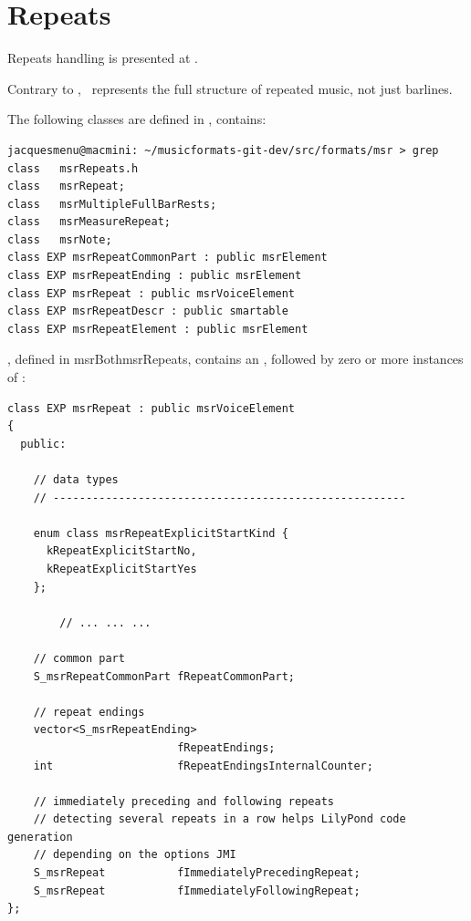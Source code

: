 \section{Repeats}\label{Repeats}

Repeats handling is presented at .

Contrary to \mxml, \mf\ represents the full structure of repeated music, not just barlines.

The following classes are defined in , contains:
\begin{lstlisting}[language=Terminal]
jacquesmenu@macmini: ~/musicformats-git-dev/src/formats/msr > grep class   msrRepeats.h
class   msrRepeat;
class   msrMultipleFullBarRests;
class   msrMeasureRepeat;
class   msrNote;
class EXP msrRepeatCommonPart : public msrElement
class EXP msrRepeatEnding : public msrElement
class EXP msrRepeat : public msrVoiceElement
class EXP msrRepeatDescr : public smartable
class EXP msrRepeatElement : public msrElement
\end{lstlisting}

, defined in msrBoth{msrRepeats}, contains an , followed by zero or more instances of :
\begin{lstlisting}[language=CPlusPlus]
class EXP msrRepeat : public msrVoiceElement
{
  public:

    // data types
    // ------------------------------------------------------

    enum class msrRepeatExplicitStartKind {
      kRepeatExplicitStartNo,
      kRepeatExplicitStartYes
    };

		// ... ... ...

    // common part
    S_msrRepeatCommonPart fRepeatCommonPart;

    // repeat endings
    vector<S_msrRepeatEnding>
                          fRepeatEndings;
    int                   fRepeatEndingsInternalCounter;

    // immediately preceding and following repeats
    // detecting several repeats in a row helps LilyPond code generation
    // depending on the options JMI
    S_msrRepeat           fImmediatelyPrecedingRepeat;
    S_msrRepeat           fImmediatelyFollowingRepeat;
};
\end{lstlisting}


